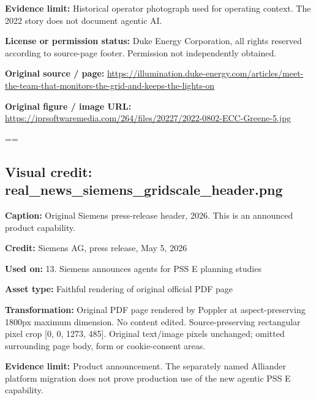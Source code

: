 \documentclass[10pt,letterpaper]{article}
\begin{document}
\textbf{Evidence limit:} Historical operator photograph used for operating context. The 2022 story does not document agentic AI.\par
\textbf{License or permission status:} Duke Energy Corporation, all rights reserved according to source-page footer. Permission not independently obtained.\par
\textbf{Original source / page:} \href{https://illumination.duke-energy.com/articles/meet-the-team-that-monitors-the-grid-and-keeps-the-lights-on}{\small\ttfamily https:/\allowbreak{}/\allowbreak{}illumination.\allowbreak{}duke-\allowbreak{}energy.\allowbreak{}com/\allowbreak{}articles/\allowbreak{}meet-\allowbreak{}the-\allowbreak{}team-\allowbreak{}that-\allowbreak{}monitors-\allowbreak{}the-\allowbreak{}grid-\allowbreak{}and-\allowbreak{}keeps-\allowbreak{}the-\allowbreak{}lights-\allowbreak{}on}\par
\textbf{Original figure / image URL:} \href{https://iprsoftwaremedia.com/264/files/20227/2022-0802-ECC-Greene-5.jpg}{\small\ttfamily https:/\allowbreak{}/\allowbreak{}iprsoftwaremedia.\allowbreak{}com/\allowbreak{}264/\allowbreak{}files/\allowbreak{}20227/\allowbreak{}2022-\allowbreak{}0802-\allowbreak{}ECC-\allowbreak{}Greene-\allowbreak{}5.\allowbreak{}jpg}\par
\egroup\par\noindent\box\readingEntry\par\medskip
\setbox\readingEntry=\vbox\bgroup\hsize=\linewidth\subsection*{Visual credit: real\_news\_siemens\_gridscale\_header.png}
\textbf{Caption:} Original Siemens press-release header, 2026. This is an announced product capability.\par
\textbf{Credit:} Siemens AG, press release, May 5, 2026\par
\textbf{Used on:} 13. Siemens announces agents for PSS E planning studies\par
\textbf{Asset type:} Faithful rendering of original official PDF page\par
\textbf{Transformation:} Original PDF page rendered by Poppler at aspect-preserving 1800px maximum dimension. No content edited. Source-preserving rectangular pixel crop [0, 0, 1273, 485]. Original text/image pixels unchanged; omitted surrounding page body, form or cookie-consent areas.\par
\textbf{Evidence limit:} Product announcement. The separately named Alliander platform migration does not prove production use of the new agentic PSS E capability.\par
\end{document}
